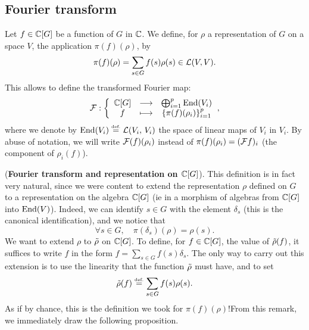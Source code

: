 \subsection{Fourier transform}
 
 
\begin{defn}
\label{defn-transform-fourier-group-non-commutative}
\label{notation-91} \label{notation-92} Let $ f \in \mathbb{C} [G] $ be a function of $G$ in $ \mathbb{C} $. We define, for $ \rho $ a representation of $G$ on a space $V$, the application $ \pi (f) (\rho) $, by
\begin{equation*}
\pi (f) (\rho) = \sum_{s \in G}{f(s) \rho (s)} \in \mathcal{L} (V, V).
\end{equation*}
This allows to define the transformed Fourier map:
\begin{equation}
\label{eq-defn-trans-fourier-representation}
\mathcal{F}: {\left\{ \begin{array}{ccc} \mathbb{C} [G] & \longrightarrow & \bigoplus_{i = 1}^p{\operatorname{End}(V_i)} \\ f & \longmapsto & \{\pi (f) (\rho_i)\}_{i = 1}^p \end{array} \right.},
\end{equation}
where we denote by $ \operatorname{End}(V_i) \stackrel{\mbox{\upshape\tiny def.}}{=} \mathcal{L} (V_i, \, V_i) $ the space of linear maps of $ V_i $ in $ V_i $. By abuse of notation, we will write $ \mathcal{F}(f) (\rho_i) $ instead of $ \pi (f) (\rho_i) = (\mathcal{F} f)_i $ (the  component of $ \rho_i (f) $).
\end{defn}
 
 
\begin{rem}{(\upshape \textbf{Fourier transform and representation on $ \mathbb{C} [G] $}).}
 This definition is in fact very natural, since we were content to extend the representation $ \rho $ defined on $G$ to a representation on the algebra $ \mathbb{C} [G] $ (ie in a morphism of algebras from $ \mathbb{C} [G] $ into $ \operatorname{End}(V) $). Indeed, we can identify $ s \in G $ with the element $ \delta_s $ (this is the canonical identification), and we notice that
\begin{equation*}
\forall s \in G, \quad \pi (\delta_s) (\rho) = \rho (s).
\end{equation*}
We want to extend $ \rho $ to $ \tilde{\rho} $ on $ \mathbb{C} [G] $. To define, for $ f \in \mathbb{C} [G] $, the value of $ \tilde{\rho} (f) $, it suffices to write $ f $ in the form $ f = \sum_{s \in G}{f(s) \delta_s} $. The only way to carry out this extension is to use the linearity that the function $ \tilde{\rho} $ must have, and to set
\begin{equation*}
\tilde{\rho} (f) \stackrel{\mbox{\upshape\tiny def.}}{=} \sum_{s \in G}{f(s) \rho (s)}.
\end{equation*}
As if by chance, this is the definition we took for $ \pi (f) (\rho) $!From this remark, we immediately draw the following proposition.
\end{rem}
 
